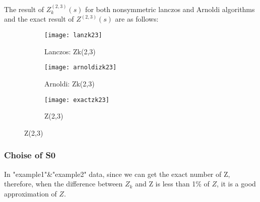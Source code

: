 \documentclass[11pt]{article}
\begin{document}
The result of $Z_k^{(2,3)}(s)$ for both nonsymmetric lanczos and Arnoldi algorithms and the exact result of $Z^{(2,3)}(s)$ are as follows:
\begin{figure}
	\centering
	\begin{subfigure}{.3\textwidth}
		\centering
		\texttt{[image: lanzk23]}
		\caption{Lanczos: Zk(2,3)}
	\end{subfigure}
	\begin{subfigure}{.3\textwidth}
		\centering
		\texttt{[image: arnoldizk23]}
		\caption{Arnoldi: Zk(2,3)}
	\end{subfigure}
	\begin{subfigure}{.3\textwidth}
		\centering
		\texttt{[image: exactzk23]}
		\caption{Z(2,3)}
	\end{subfigure}
\end{figure}

\subsubsection{Choise of S0}
 In "example1"\&"example2" data, since we can get the exact number of Z, therefore,  when the difference between $Z_k$ and Z is less than 1\% of $Z$, it is a good approximation of $Z$.




\end{document}
